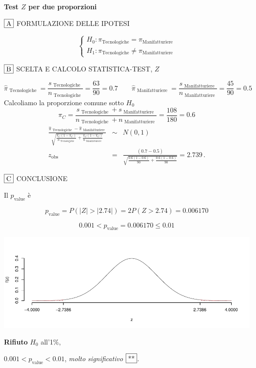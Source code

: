 \documentclass[
  11pt,
]{book}
\theoremstyle{mytheoremstyle}
\theoremstyle{mydefstyle}
\newenvironment{sol}
  {
  \begin{tcolorbox}[enhanced,breakable,arc=0.1mm,boxrule=1pt,colback=white,colframe=iblue,
  title=\bf \fontfamily{lmss}\selectfont \hspace{.5 cm} Soluzione,drop fuzzy shadow]

}{
\end{tcolorbox}
  }
\begin{document}
\begin{sol}
\textbf{Test \(Z\) per due proporzioni}

\(\fbox{A}\) FORMULAZIONE DELLE IPOTESI

\[\begin{cases}
   H_0: \pi_\text{Tecnologiche} = \pi_\text{Manifatturiere} \\
   H_1: \pi_\text{Tecnologiche} \neq \pi_\text{Manifatturiere} 
   \end{cases}\]

\(\fbox{B}\) SCELTA E CALCOLO STATISTICA-TEST, \(Z\)

\[\hat\pi_\text{ Tecnologiche }=\frac{s_\text{ Tecnologiche }}{n_\text{ Tecnologiche }}=\frac{ 63 }{ 90 }= 0.7 \qquad
   \hat\pi_\text{ Manifatturiere }=\frac{s_\text{ Manifatturiere }}{n_\text{ Manifatturiere }}=\frac{ 45 }{ 90 }= 0.5 \]Calcoliamo la proporzione comune sotto \(H_0\)
\[
     \pi_C=\frac{s_\text{ Tecnologiche }+s_\text{ Manifatturiere }}{n_\text{ Tecnologiche }+n_\text{ Manifatturiere }}=
     \frac{ 108 }{ 180 }= 0.6 
   \]\begin{eqnarray*}
   \frac{\hat\pi_\text{ Tecnologiche } - \hat\pi_\text{ Manifatturiere }}
   {\sqrt{\frac {\pi_C(1-\pi_C)}{n_\text{ Tecnologiche }}+\frac {\pi_C(1-\pi_C)}{n_\text{ Manifatturiere }}}}&\sim&N(0,1)\\
   z_{\text{obs}}
   &=& \frac{ ( 0.7 -  0.5 )} {\sqrt{\frac{ 0.6 (1- 0.6 )}{ 90 }+\frac{ 0.6 (1- 0.6 )}{ 90 }}}
   =   2.739 \, .
   \end{eqnarray*}

\(\fbox{C}\) CONCLUSIONE

Il \(p_{\text{value}}\) è

\[ p_{\text{value}} = P(|Z|>|2.74|)=2P(Z>2.74)=0.006170 \]

\[
 0.001 < p_\text{value}= 0.006170 \leq 0.01 
\]

\begin{center}\includegraphics{Esami_passati_con_soluzioni_files/figure-latex/05-test-18,-1} \end{center}

\textbf{Rifiuto} \(H_0\) all'1\%,

\(0.001<p_\text{value}<0.01\), \emph{molto significativo} \(\fbox{**}\).

\end{sol}
\end{document}
